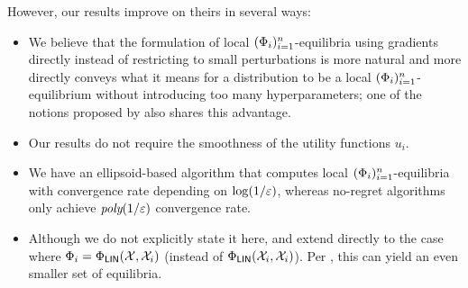 However, our results improve on theirs in several ways:
\begin{itemize}
    \item We believe that the formulation of local $(\Phi_i)_{i=1}^n$-equilibria using gradients directly instead of restricting to small perturbations is more natural and more directly conveys what it means for a distribution to be a local $(\Phi_i)_{i=1}^n$-equilibrium without introducing too many hyperparameters; one of the notions proposed by \citet[Definition 6]{Ahunbay25:First} also shares this advantage.
    \item Our results do not require the smoothness of the utility functions $u_i$.
    \item We have an ellipsoid-based algorithm that computes local $(\Phi_i)_{i=1}^n$-equilibria with convergence rate depending on $\log(1/\varepsilon)$, whereas no-regret algorithms only achieve $\textit{poly}(1/\varepsilon)$ convergence rate.
    \item Although we do not explicitly state it here,  and  extend directly to the case where $\Phi_i = \Phi_\mathsf{LIN}({\mathcal{X}}, {\mathcal{X}}_i)$ (instead of $\Phi_\mathsf{LIN}({\mathcal{X}}_i, {\mathcal{X}}_i)$). Per , this can yield an even smaller set of equilibria.
\end{itemize}
